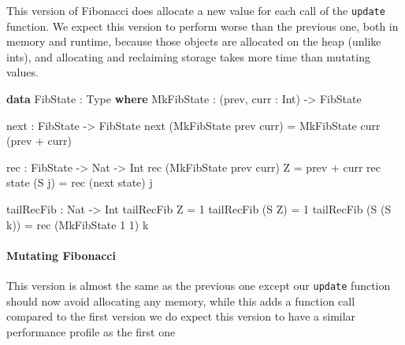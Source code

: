 \documentclass[
]{article}
\newenvironment{Shaded}{}{}
\newcommand{\DataTypeTok}[1]{\textcolor[rgb]{0.56,0.13,0.00}{#1}}
\newcommand{\DecValTok}[1]{\textcolor[rgb]{0.25,0.63,0.44}{#1}}
\newcommand{\KeywordTok}[1]{\textcolor[rgb]{0.00,0.44,0.13}{\textbf{#1}}}
\newcommand{\NormalTok}[1]{#1}
\newcommand{\OperatorTok}[1]{\textcolor[rgb]{0.40,0.40,0.40}{#1}}
\newcommand{\OtherTok}[1]{\textcolor[rgb]{0.00,0.44,0.13}{#1}}
\begin{document}
This version of Fibonacci does allocate a new value for each call of the
\texttt{update} function. We expect this version to perform worse than
the previous one, both in memory and runtime, because those objects are
allocated on the heap (unlike ints), and allocating and reclaiming
storage takes more time than mutating values.

\begin{Shaded}
\begin{Highlighting}[]
\KeywordTok{data} \DataTypeTok{FibState} \OperatorTok{:} \DataTypeTok{Type} \KeywordTok{where}
  \DataTypeTok{MkFibState} \OperatorTok{:}\NormalTok{ (prev, curr }\OperatorTok{:}  \DataTypeTok{Int}\NormalTok{) }\OtherTok{{-}\textgreater{}} \DataTypeTok{FibState}

\NormalTok{next }\OperatorTok{:} \DataTypeTok{FibState} \OtherTok{{-}\textgreater{}} \DataTypeTok{FibState}
\NormalTok{next (}\DataTypeTok{MkFibState}\NormalTok{ prev curr) }\OtherTok{=} \DataTypeTok{MkFibState}\NormalTok{ curr (prev }\OperatorTok{+}\NormalTok{ curr)}

\NormalTok{rec }\OperatorTok{:} \DataTypeTok{FibState} \OtherTok{{-}\textgreater{}} \DataTypeTok{Nat} \OtherTok{{-}\textgreater{}} \DataTypeTok{Int}
\NormalTok{rec (}\DataTypeTok{MkFibState}\NormalTok{ prev curr) }\DataTypeTok{Z} \OtherTok{=}\NormalTok{ prev }\OperatorTok{+}\NormalTok{ curr}
\NormalTok{rec state (}\DataTypeTok{S}\NormalTok{ j) }\OtherTok{=}\NormalTok{ rec (next state) j}

\NormalTok{tailRecFib }\OperatorTok{:} \DataTypeTok{Nat} \OtherTok{{-}\textgreater{}} \DataTypeTok{Int}
\NormalTok{tailRecFib }\DataTypeTok{Z} \OtherTok{=} \DecValTok{1}
\NormalTok{tailRecFib (}\DataTypeTok{S} \DataTypeTok{Z}\NormalTok{) }\OtherTok{=} \DecValTok{1}
\NormalTok{tailRecFib (}\DataTypeTok{S}\NormalTok{ (}\DataTypeTok{S}\NormalTok{ k)) }\OtherTok{=}\NormalTok{ rec (}\DataTypeTok{MkFibState} \DecValTok{1} \DecValTok{1}\NormalTok{) k}
\end{Highlighting}
\end{Shaded}

\hypertarget{mutating-fibonacci}{%
\paragraph{Mutating Fibonacci}\label{mutating-fibonacci}}

This version is almost the same as the previous one except our
\texttt{update} function should now avoid allocating any memory, while
this adds a function call compared to the first version we do expect
this version to have a similar performance profile as the first one
\end{document}
